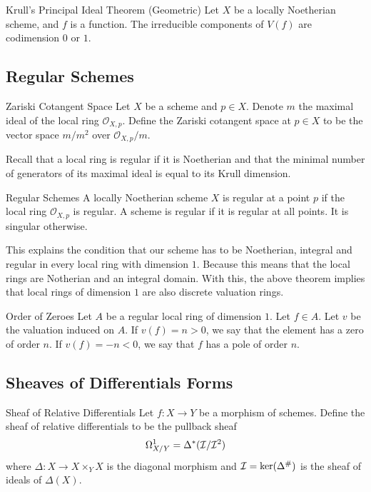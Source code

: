 \documentclass[a4paper]{article}
\begin{document}
\begin{thm}{Krull's Principal Ideal Theorem (Geometric)}{} Let $X$ be a locally Noetherian scheme, and $f$ is a function. The irreducible components of $V(f)$ are codimension $0$ or $1$. 
\end{thm}

\subsection{Regular Schemes}
\begin{defn}{Zariski Cotangent Space}{} Let $X$ be a scheme and $p\in X$. Denote $m$ the maximal ideal of the local ring $\mathcal{O}_{X,p}$. Define the Zariski cotangent space at $p\in X$ to be the vector space $m/m^2$ over $\mathcal{O}_{X,p}/m$. 
\end{defn}

Recall that a local ring is regular if it is Noetherian and that the minimal number of generators of its maximal ideal is equal to its Krull dimension. 

\begin{defn}{Regular Schemes}{} A locally Noetherian scheme $X$ is regular at a point $p$ if the local ring $\mathcal{O}_{X,p}$ is regular. A scheme is regular if it is regular at all points. It is singular otherwise. 
\end{defn}

This explains the condition that our scheme has to be Noetherian, integral and regular in every local ring with dimension $1$. Because this means that the local rings are Notherian and an integral domain. With this, the above theorem implies that local rings of dimension $1$ are also discrete valuation rings. 

\begin{defn}{Order of Zeroes}{} Let $A$ be a regular local ring of dimension $1$. Let $f\in A$. Let $v$ be the valuation induced on $A$. If $v(f)=n>0$, we say that the element has a zero of order $n$. If $v(f)=-n<0$, we say that $f$ has a pole of order $n$. 
\end{defn}

\subsection{Sheaves of Differentials Forms}
\begin{defn}{Sheaf of Relative Differentials}{} Let $f:X\to Y$ be a morphism of schemes. Define the sheaf of relative differentials to be the pullback sheaf $$\Omega_{X/Y}^1=\Delta^\ast(\mathcal{I}/\mathcal{I}^2)$$ where $\Delta:X\to X\times_YX$ is the diagonal morphism and $\mathcal{I}=\ker(\Delta^\#)$ is the sheaf of ideals of $\Delta(X)$. 
\end{defn}
\end{document}
